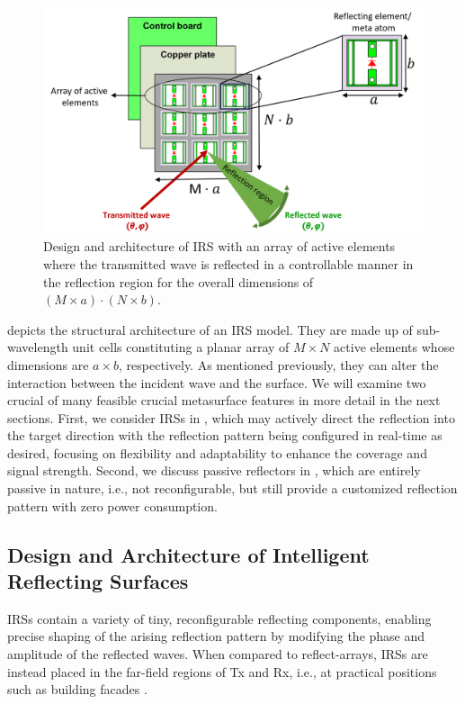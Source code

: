 \begin{figure}[tb]
	\centering
	\includegraphics[width=1.0\linewidth]{images/Section 2 Images/IRS}
	\caption{Design and architecture of IRS with an array of active elements where the transmitted wave is reflected in a controllable manner in the reflection region for the overall dimensions of $(M\times a) \cdot (N \times b)$.}
	\label{fig:irs}
\end{figure}
 depicts the structural architecture of an IRS model. They are made up of sub-wavelength unit cells constituting a planar array of $M \times N$ active elements whose dimensions are $a \times b$, respectively. As mentioned previously, they can alter the interaction between the incident wave and the surface. We will examine two crucial of many feasible crucial metasurface features in more detail in the next sections. First, we consider IRSs in , which may actively direct the reflection into the target direction with the reflection pattern being configured in real-time as desired, focusing on flexibility and adaptability to enhance the coverage and signal strength. Second, we discuss passive reflectors in , which are entirely passive in nature, i.e., not reconfigurable, but still provide a customized reflection pattern with zero power consumption.

\subsection{Design and Architecture of Intelligent Reflecting Surfaces} \label{IRS}
\ac{IRS}s contain a variety of tiny, reconfigurable reflecting components, enabling precise shaping of the arising reflection pattern by modifying the phase and amplitude of the reflected waves. When compared to reflect-arrays, \ac{IRS}s are instead placed in the far-field regions of Tx and Rx, i.e., at practical positions such as building facades \cite{IRS_citations}.

